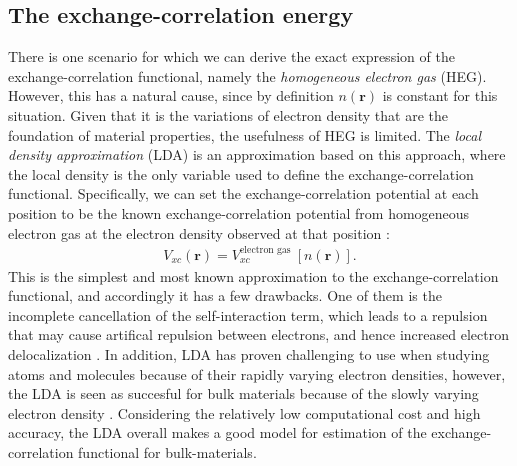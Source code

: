 


\subsection{The exchange-correlation energy}


There is one scenario for which we can derive the exact expression of the exchange-correlation functional, namely the \textit{homogeneous electron gas} (HEG). However, this has a natural cause, since by definition $n(\textbf{r})$ is constant for this situation. Given that it is the variations of electron density that are the foundation of material properties, the usefulness of HEG is limited. The \textit{local density approximation} (LDA) is an approximation based on this approach, where the local density is the only variable used to define the exchange-correlation functional. Specifically, we can set the exchange-correlation potential at each position to be the known exchange-correlation potential from homogeneous electron gas at the electron density observed at that position \cite{Kohn1965}:
\begin{align}
  V_{xc}(\textbf{r}) = V_{xc}^{\text{electron gas }}\left[n(\textbf{r})\right].
\end{align}
This is the simplest and most known approximation to the exchange-correlation functional, and accordingly it has a few drawbacks. One of them is the incomplete cancellation of the self-interaction term, which leads to a repulsion that may cause artifical repulsion between electrons, and hence increased electron delocalization \cite{Allen2014}. In addition, LDA has proven challenging  to use when studying atoms and molecules because of their rapidly varying electron densities, however, the LDA is seen as succesful for bulk materials because of the slowly varying electron density \cite{DavidSholl2009}. Considering the relatively low computational cost and high accuracy, the LDA overall makes a good model for estimation of the exchange-correlation functional for bulk-materials.


